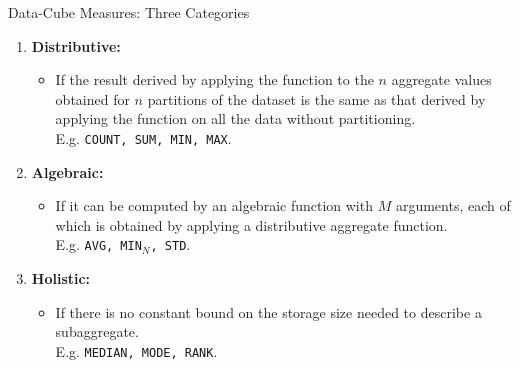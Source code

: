 \begin{frame}{Data-Cube Measures: Three Categories}
	\begin{enumerate}
		\item \textbf{Distributive:}
		      \begin{itemize}
			      \item If the result derived by applying the function to the $n$ aggregate values obtained for $n$ partitions of the dataset is the same as that derived by applying the function on all the data without partitioning.\\
			            E.g. \texttt{COUNT, SUM, MIN, MAX}.
		      \end{itemize}
		\item \textbf{Algebraic:}
		      \begin{itemize}
			      \item If it can be computed by an algebraic function with $M$ arguments, each of which is obtained by applying a distributive aggregate function.\\
			            E.g. \texttt{AVG, MIN$_N$, STD}.
		      \end{itemize}
		\item \textbf{Holistic:}
		      \begin{itemize}
			      \item If there is no constant bound on the storage size needed to describe a subaggregate.\\
			            E.g. \texttt{MEDIAN, MODE, RANK}.
		      \end{itemize}
	\end{enumerate}
\end{frame}

